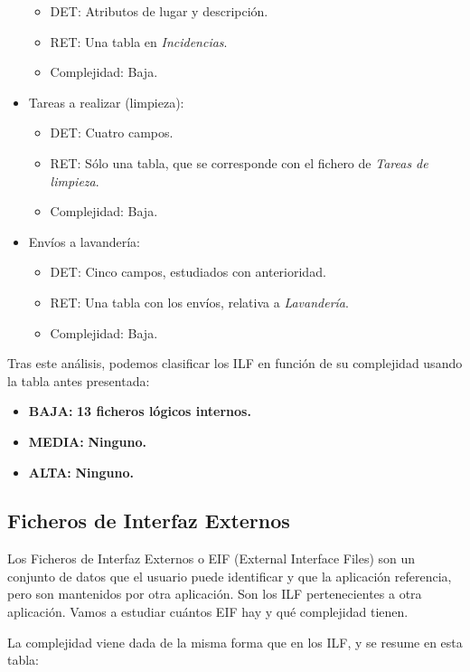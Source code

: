 \documentclass[spanish,a4paper,11pt, twoside]{report}	%
\begin{document}
\begin{itemize}
\begin{itemize}
 			\item{DET:} Atributos de lugar y descripción.
			\item{RET:} Una tabla en \textit{Incidencias}.
			\item{Complejidad:} Baja.
		\end{itemize}
		\item{Tareas a realizar (limpieza):} 
		\begin{itemize}
 			\item{DET:} Cuatro campos.
			\item{RET:} Sólo una tabla, que se corresponde con el fichero de \textit{Tareas de limpieza}.
			\item{Complejidad:} Baja.
		\end{itemize}
		\item{Envíos a lavandería:} 
		\begin{itemize}
 			\item{DET:} Cinco campos, estudiados con anterioridad.
			\item{RET:} Una tabla con los envíos, relativa a \textit{Lavandería}.
			\item{Complejidad:} Baja.
		\end{itemize}
	\end{itemize}

	Tras este análisis, podemos clasificar los ILF en función de su complejidad usando la tabla antes presentada:
	\begin{itemize}
	\item{\textbf{BAJA:}} \textbf{13 ficheros lógicos internos.}
	\item{\textbf{MEDIA:}} \textbf{Ninguno.}
	\item{\textbf{ALTA:}} \textbf{Ninguno.}
	\end{itemize}

	\subsection{Ficheros de Interfaz Externos}
		Los Ficheros de Interfaz Externos o EIF (External Interface Files) son un conjunto de datos que el usuario puede identificar y que la aplicación referencia, pero son mantenidos por otra aplicación. Son los ILF pertenecientes a otra aplicación. Vamos a estudiar cuántos EIF hay y qué complejidad tienen. 

	La complejidad viene dada de la misma forma que en los ILF, y se resume en esta tabla: 

\vspace{0.35cm}
\end{document}
